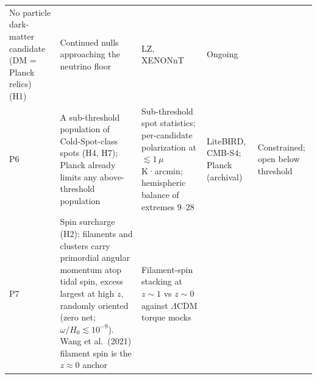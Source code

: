 \documentclass[
]{article}
\begin{document}
\begin{longtable}[]{@{}lllll@{}}
\begin{minipage}[t]{0.19\columnwidth}
No particle dark-matter candidate (DM = Planck relics) (H1)\strut
\end{minipage} & \begin{minipage}[t]{0.19\columnwidth}\raggedright
Continued nulls approaching the neutrino floor\strut
\end{minipage} & \begin{minipage}[t]{0.19\columnwidth}\raggedright
LZ, XENONnT\strut
\end{minipage} & \begin{minipage}[t]{0.19\columnwidth}\raggedright
Ongoing\strut
\end{minipage}\tabularnewline
\begin{minipage}[t]{0.11\columnwidth}\raggedright
P6\strut
\end{minipage} & \begin{minipage}[t]{0.19\columnwidth}\raggedright
A sub-threshold population of Cold-Spot-class spots (H4, H7); Planck
already limits any above-threshold population\strut
\end{minipage} & \begin{minipage}[t]{0.19\columnwidth}\raggedright
Sub-threshold spot statistics; per-candidate polarization at
\(\lesssim 1\,\mu\)K·arcmin; hemispheric balance of extremes
\(9\)--\(28\)\strut
\end{minipage} & \begin{minipage}[t]{0.19\columnwidth}\raggedright
LiteBIRD, CMB-S4; Planck (archival)\strut
\end{minipage} & \begin{minipage}[t]{0.19\columnwidth}\raggedright
Constrained; open below threshold\strut
\end{minipage}\tabularnewline
\begin{minipage}[t]{0.11\columnwidth}\raggedright
P7\strut
\end{minipage} & \begin{minipage}[t]{0.19\columnwidth}\raggedright
Spin surcharge (H2): filaments and clusters carry primordial angular
momentum atop tidal spin, excess largest at high \(z\), randomly
oriented (zero net; \(\omega/H_0 \lesssim 10^{-9}\)). Wang et al.~(2021)
filament spin is the \(z \approx 0\) anchor\strut
\end{minipage} & \begin{minipage}[t]{0.19\columnwidth}\raggedright
Filament-spin stacking at \(z \sim 1\) vs \(z \sim 0\) against
\(\Lambda\)CDM torque mocks\strut
\end{minipage} & \begin{minipage}[t]{0.19\columnwidth}\raggedright

\end{minipage}
\end{longtable}
\end{document}
